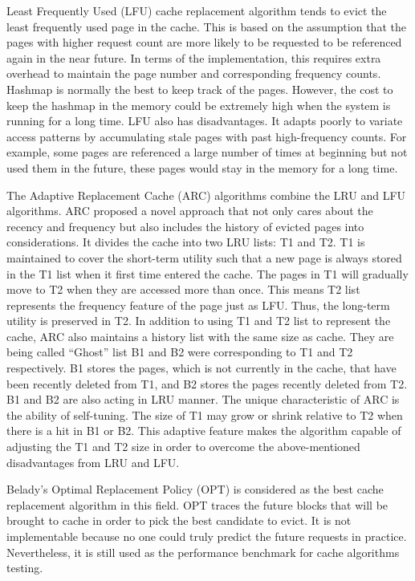 \documentclass[letterpaper,twocolumn,10pt]{article}
\begin{document}
Least Frequently Used (LFU) cache replacement algorithm tends to evict the least frequently used page in the cache. This is based on the assumption that the pages with higher request count are more likely to be requested to be referenced again in the near future\cite{coffman1973operating}. In terms of the implementation, this requires extra overhead to maintain the page number and corresponding frequency counts. Hashmap is normally the best to keep track of the pages. However, the cost to keep the hashmap in the memory could be extremely high when the system is running for a long time. LFU also has disadvantages. It adapts poorly to variate access patterns by accumulating stale pages with past high-frequency counts. For example, some pages are referenced a large number of times at beginning but not used them in the future, these pages would stay in the memory for a long time. 

The Adaptive Replacement Cache (ARC) algorithms combine the LRU and LFU algorithms\cite{megiddo2003arc}. ARC proposed a novel approach that not only cares about the recency and frequency but also includes the history of evicted pages into considerations\cite{consuegra2015analyzing}. It divides the cache into two LRU lists: T1 and T2. T1 is maintained to cover the short-term utility such that a new page is always stored in the T1 list when it first time entered the cache. The pages in T1 will gradually move to T2 when they are accessed more than once. This means T2 list represents the frequency feature of the page just as LFU. Thus, the long-term utility is preserved in T2. In addition to using T1 and T2 list to represent the cache, ARC also maintains a history list with the same size as cache. They are being called “Ghost” list B1 and B2 were corresponding to T1 and T2 respectively. B1 stores the pages, which is not currently in the cache, that have been recently deleted from T1, and B2 stores the pages recently deleted from T2. B1 and B2 are also acting in LRU manner. The unique characteristic of ARC is the ability of self-tuning. The size of T1 may grow or shrink relative to T2 when there is a hit in B1 or B2. This adaptive feature makes the algorithm capable of adjusting the T1 and T2 size in order to overcome the above-mentioned disadvantages from LRU and LFU.

Belady's Optimal Replacement Policy (OPT) is considered as the best cache replacement algorithm in this field\cite{belady1966study}\cite{mattson1970evaluation}. OPT traces the future blocks that will be brought to cache in order to pick the best candidate to evict. It is not implementable because no one could truly predict the future requests in practice. Nevertheless, it is still used as the performance benchmark for cache algorithms testing. 
\end{document}
